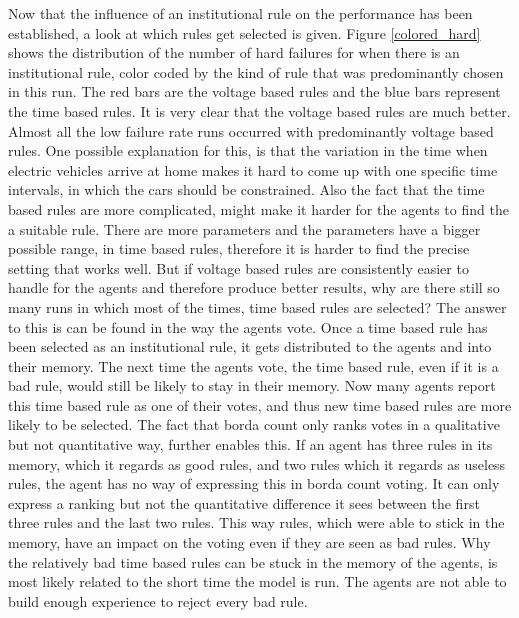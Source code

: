 \documentclass[a4paper]{article}
\begin{document}
\newpage
Now that the influence of an institutional rule on the performance has been established, a look at which rules get selected is given. 
Figure \ref{colored_hard} shows the distribution of the number of hard failures for when there is an institutional rule, color coded 
by the kind of rule that was predominantly chosen in this run. The red bars are the voltage based rules and the blue bars represent the 
time based rules. It is very clear that the voltage based rules are much better. Almost all the low failure rate runs occurred with 
predominantly voltage based rules. One possible explanation for this, is that the variation in the time when electric vehicles arrive at
home makes it hard to come up with one specific time intervals, in which the cars should be constrained. Also the fact that the time
based rules are more complicated, might make it harder for the agents to find the a suitable rule. There are more parameters and the 
parameters have a bigger possible range, in time based rules, therefore it is harder to find the precise setting that works well. 
But if voltage based rules are consistently easier to handle for the agents and therefore produce better results, why are there 
still so many runs in which most of the times, time based rules are selected? The answer to this is can be found in the way the agents
vote. Once a time based rule has been selected as an institutional rule, it gets distributed to the agents and into their memory. The 
next time the agents vote, the time based rule, even if it is a bad rule, would still be likely to stay in their memory. Now many 
agents report this time based rule as one of their votes, and thus new time based rules are more likely to be selected. The fact that 
borda count only ranks votes in a qualitative but not quantitative way, further enables this. 
If an agent has three rules in its memory, which it regards as good rules, and two rules which it regards as useless rules, the agent 
has no way of expressing this in borda count voting. It can only  express a ranking but not the quantitative difference it sees 
between the first three rules and the last two rules. This way rules, which were able to stick in the memory, have an impact on the 
voting even if they are seen as bad rules. Why the relatively bad time based rules can be stuck in the memory of the agents, is most 
likely related to the short time the model is run. The agents are not able to build enough experience to reject every bad rule. \\
\end{document}
